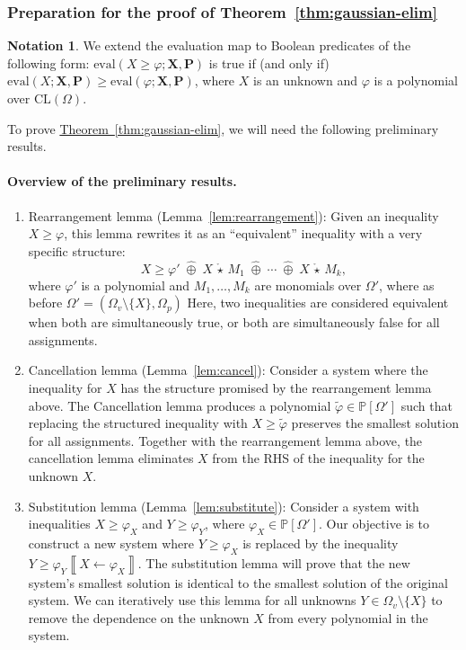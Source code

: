 \documentclass[10pt]{amsart}
\theoremstyle{plain}
\theoremstyle{definition}
\newtheorem{notation}[lemma]{Notation}
\providecommand{\namedref}[2]{\hyperref[#2]{#1~\ref*{#2}}\xspace}
\providecommand{\theoremref}[1]{\namedref{Theorem}{thm:#1}}
\providecommand{\bP}[0]{\ensuremath{\mathbf P}\xspace}
\providecommand{\bX}[0]{\ensuremath{\mathbf X}\xspace}
\let\geq\geqslant
\providecommand{\cplus}[0]{\ensuremath{\hat{\oplus}}\xspace}
\providecommand{\cmult}[0]{\ensuremath{{\,\mathring{\star}\,}}\xspace}
\providecommand{\CL}[0]{\ensuremath{\mathrm{CL}}\xspace}
\providecommand{\evalmap}[0]{\ensuremath{\mathrm{eval}}\xspace}
\begin{document}
\subsubsection{Preparation for the proof of Theorem~\ref{thm:gaussian-elim}}
\begin{notation}
We extend the evaluation map to Boolean predicates of the following form: 
    $\evalmap(X\geq \varphi ;\bX,\bP)$ is true if (and only if) $\evalmap(X;\bX,\bP) \geq \evalmap(\varphi;\bX,\bP)$, where $X$ is an unknown and $\varphi$ is a polynomial over $\CL(\Omega)$.
\end{notation}


To prove \theoremref{gaussian-elim}, we will need the following preliminary results. 

\paragraph{Overview of the preliminary results.}
\begin{enumerate}[1.] 
    \item Rearrangement lemma (Lemma~\ref{lem:rearrangement}): 
        Given an inequality $X\geq \varphi$, this lemma rewrites it as an ``equivalent'' inequality with a very specific structure: 
            $$X\geq\varphi' \;\cplus\; X\cmult M_1 \;\cplus\; \dotsi \;\cplus\; X\cmult M_k, $$
        where $\varphi'$ is a polynomial and $M_1, \dotsc, M_k$ are monomials over $\Omega'$, where as before $\Omega' = (\Omega_v \setminus \{X\}, \Omega_p)$ 
        Here, two inequalities are considered equivalent when both are simultaneously true, or both are simultaneously false for all assignments. 

    \item Cancellation lemma (Lemma~\ref{lem:cancel}): 
        Consider a system where the inequality for $X$ has the structure promised by the rearrangement lemma above. 
        The Cancellation lemma produces a polynomial $\widetilde{\varphi} \in  \mathbb{P}[\Omega']$ such that replacing the structured inequality with $X\geq \widetilde\varphi$ preserves the smallest solution for all assignments. 
        Together with the rearrangement lemma above, the cancellation lemma eliminates $X$ from the RHS of the inequality for the unknown $X$. 

    \item Substitution lemma (Lemma~\ref{lem:substitute}): 
        Consider a system with inequalities $X\geq \varphi_X$ and $Y\geq\varphi_Y$, where $\varphi_X \in \mathbb{P}[\Omega']$. 
        Our objective is to construct a new system where $Y\geq \varphi_X$ is replaced by the inequality $Y\geq \varphi_Y\left\llbracket X\gets\varphi_X\right\rrbracket$. 
        The substitution lemma will prove that the new system's smallest solution is identical to the smallest solution of the original system. 
        We can iteratively use this lemma for all unknowns $Y\in \Omega_v \setminus\{X\}$ to remove the dependence on the unknown $X$ from every polynomial in the system. 
\end{enumerate}
\end{document}
